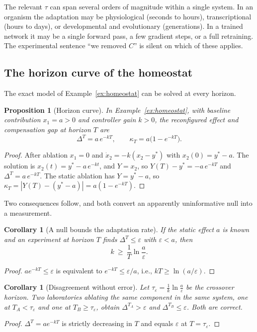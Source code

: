 \documentclass[11pt]{article}
\newtheorem{proposition}[theorem]{Proposition}
\newtheorem{corollary}[theorem]{Corollary}
\theoremstyle{definition}
\theoremstyle{remark}
\begin{document}
The relevant $\tau$ can span several orders of magnitude within a single system. In an organism the adaptation may be physiological (seconds to hours), transcriptional (hours to days), or developmental and evolutionary (generations). In a trained network it may be a single forward pass, a few gradient steps, or a full retraining. The experimental sentence ``we removed $C$'' is silent on which of these applies.

\subsection{The horizon curve of the homeostat}

The exact model of Example~\ref{ex:homeostat} can be solved at every horizon.

\begin{proposition}[Horizon curve]\label{prop:horizon}
In Example~\ref{ex:homeostat}, with baseline contribution $x_1=a>0$ and controller gain $k>0$, the reconfigured effect and compensation gap at horizon $T$ are
\[
\Delta^T=a\,e^{-kT},\qquad \kappa_T=a\bigl(1-e^{-kT}\bigr).
\]
\end{proposition}
\begin{proof}
After ablation $x_1=0$ and $\dot x_2=-k(x_2-y^*)$ with $x_2(0)=y^*-a$. The solution is $x_2(t)=y^*-a\,e^{-kt}$, and $Y=x_2$, so $Y(T)-y^*=-a\,e^{-kT}$ and $\Delta^T=a\,e^{-kT}$. The static ablation has $Y=y^*-a$, so $\kappa_T=|Y(T)-(y^*-a)|=a(1-e^{-kT})$.
\end{proof}

Two consequences follow, and both convert an apparently uninformative null into a measurement.

\begin{corollary}[A null bounds the adaptation rate]\label{cor:rate}
If the static effect $a$ is known and an experiment at horizon $T$ finds $\Delta^T\le\varepsilon$ with $\varepsilon<a$, then
\[
k\ \ge\ \frac1T\ln\frac{a}{\varepsilon}.
\]
\end{corollary}
\begin{proof}
$a e^{-kT}\le\varepsilon$ is equivalent to $e^{-kT}\le\varepsilon/a$, i.e., $kT\ge\ln(a/\varepsilon)$.
\end{proof}

\begin{corollary}[Disagreement without error]\label{cor:disagree}
Let $\tau_\varepsilon=\frac1k\ln\frac a\varepsilon$ be the crossover horizon. Two laboratories ablating the same component in the same system, one at $T_A<\tau_\varepsilon$ and one at $T_B\ge\tau_\varepsilon$, obtain $\Delta^{T_A}>\varepsilon$ and $\Delta^{T_B}\le\varepsilon$. Both are correct.
\end{corollary}
\begin{proof}
$\Delta^T=ae^{-kT}$ is strictly decreasing in $T$ and equals $\varepsilon$ at $T=\tau_\varepsilon$.
\end{proof}
\end{document}

